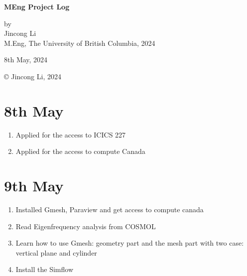 \documentclass[12pt]{article} %
\begin{document}
\setlength{\parskip}{1em} 
\setlength{\parindent}{0pt}
\newcommand{\vect}[1]{\mathbf{#1}}

\begin{titlepage}  %
    \centering    %

    \vspace*{2cm}
    
    \normalsize \textbf{MEng Project Log} \\
    \vspace{0.5cm}  %
    \vspace{2cm}  %
    
    \normalsize by\\
    \vspace{1cm}
    \normalsize Jincong Li \\ 
    \vspace{1cm}
    \normalsize M.Eng, The University of British Columbia, 2024
    \vspace{11cm}  %
    
    \normalsize 8th May, 2024

    \vfill  %
    © Jincong Li, 2024
\end{titlepage}
\tableofcontents
\newpage
\section{8th May}
\begin{enumerate}
    \item Applied for the access to ICICS 227
    \item Applied for the access to compute Canada
\end{enumerate}

\section{9th May}
\begin{enumerate}
    \item Installed Gmesh, Paraview and get access to compute canada
    \item Read Eigenfrequency analysis from COSMOL 
    \item Learn how to use Gmesh: geometry part and the mesh part with two case: vertical plane and cylinder
    \item Install the Simflow
\end{enumerate}
\end{document}
